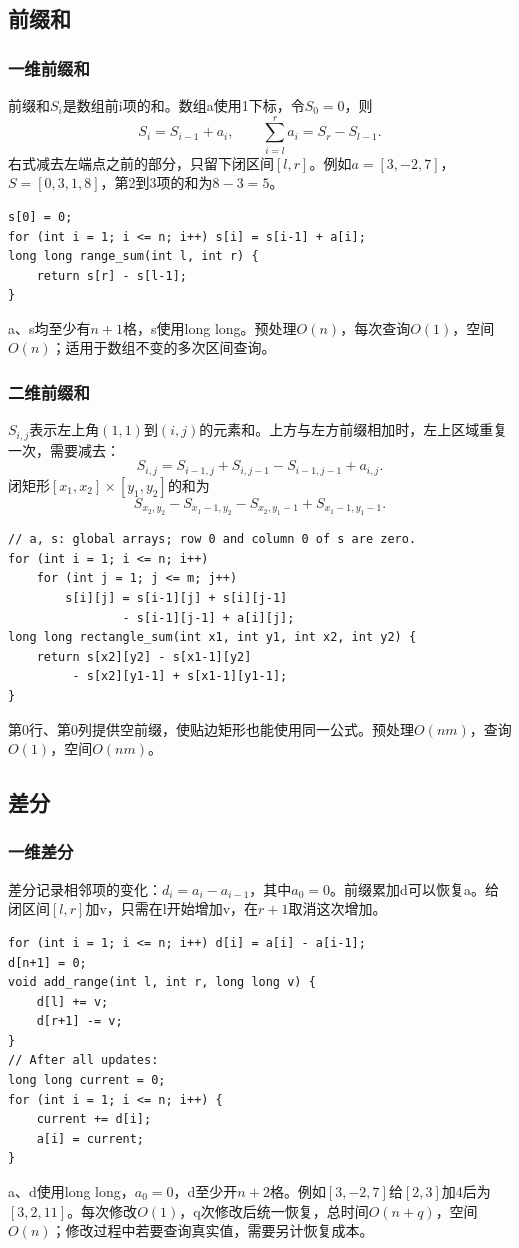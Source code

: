 \subsection{前缀和}
\subsubsection{一维前缀和}
前缀和$S_i$是数组前i项的和。数组a使用1下标，令$S_0=0$，则
\[
S_i=S_{i-1}+a_i,\qquad \sum_{i=l}^{r}a_i=S_r-S_{l-1}.
\]
右式减去左端点之前的部分，只留下闭区间$[l,r]$。例如$a=[3,-2,7]$，$S=[0,3,1,8]$，第2到3项的和为$8-3=5$。
\begin{lstlisting}
s[0] = 0;
for (int i = 1; i <= n; i++) s[i] = s[i-1] + a[i];
long long range_sum(int l, int r) {
    return s[r] - s[l-1];
}
\end{lstlisting}
a、s均至少有$n+1$格，s使用long long。预处理$O(n)$，每次查询$O(1)$，空间$O(n)$；适用于数组不变的多次区间查询。

\subsubsection{二维前缀和}
$S_{i,j}$表示左上角$(1,1)$到$(i,j)$的元素和。上方与左方前缀相加时，左上区域重复一次，需要减去：
\[
S_{i,j}=S_{i-1,j}+S_{i,j-1}-S_{i-1,j-1}+a_{i,j}.
\]
闭矩形$[x_1,x_2]\times[y_1,y_2]$的和为
\[
S_{x_2,y_2}-S_{x_1-1,y_2}-S_{x_2,y_1-1}+S_{x_1-1,y_1-1}.
\]
\begin{lstlisting}
// a, s: global arrays; row 0 and column 0 of s are zero.
for (int i = 1; i <= n; i++)
    for (int j = 1; j <= m; j++)
        s[i][j] = s[i-1][j] + s[i][j-1]
                - s[i-1][j-1] + a[i][j];
long long rectangle_sum(int x1, int y1, int x2, int y2) {
    return s[x2][y2] - s[x1-1][y2]
         - s[x2][y1-1] + s[x1-1][y1-1];
}
\end{lstlisting}
第0行、第0列提供空前缀，使贴边矩形也能使用同一公式。预处理$O(nm)$，查询$O(1)$，空间$O(nm)$。
\subsection{差分}
\subsubsection{一维差分}
差分记录相邻项的变化：$d_i=a_i-a_{i-1}$，其中$a_0=0$。前缀累加d可以恢复a。给闭区间$[l,r]$加v，只需在l开始增加v，在$r+1$取消这次增加。
\begin{lstlisting}
for (int i = 1; i <= n; i++) d[i] = a[i] - a[i-1];
d[n+1] = 0;
void add_range(int l, int r, long long v) {
    d[l] += v;
    d[r+1] -= v;
}
// After all updates:
long long current = 0;
for (int i = 1; i <= n; i++) {
    current += d[i];
    a[i] = current;
}
\end{lstlisting}
a、d使用long long，$a_0=0$，d至少开$n+2$格。例如$[3,-2,7]$给$[2,3]$加4后为$[3,2,11]$。每次修改$O(1)$，q次修改后统一恢复，总时间$O(n+q)$，空间$O(n)$；修改过程中若要查询真实值，需要另计恢复成本。

